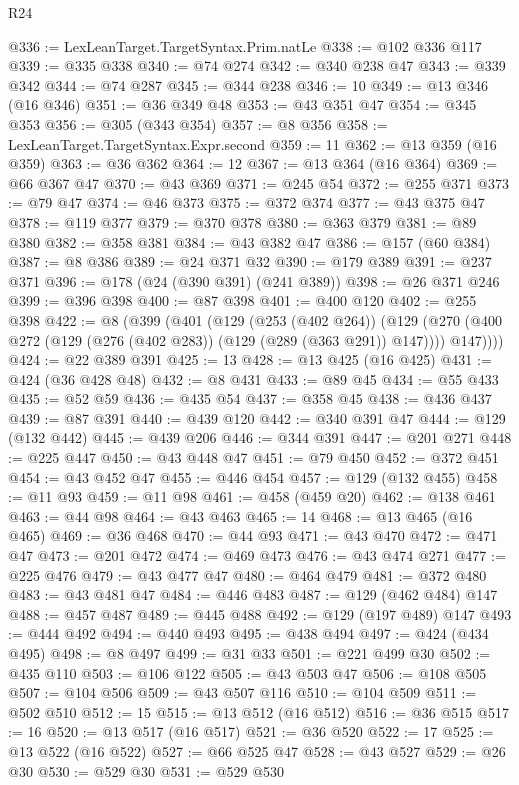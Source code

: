 \begin{lexlean}{R24}
\begin{coremodule}
{{{{{{{{{{{{{{{{{{{{{{{{{{{{{{{{{{{@336 := LexLeanTarget.TargetSyntax.Prim.natLe
@338 := @102 @336 @117
@339 := @335 @338
@340 := @74 @274
@342 := @340 @238 @47
@343 := @339 @342
@344 := @74 @287
@345 := @344 @238
@346 := 10
@349 := @13 @346 (@16 @346)
@351 := @36 @349 @48
@353 := @43 @351 @47
@354 := @345 @353
@356 := @305 (@343 @354)
@357 := @8 @356
@358 := LexLeanTarget.TargetSyntax.Expr.second
@359 := 11
@362 := @13 @359 (@16 @359)
@363 := @36 @362
@364 := 12
@367 := @13 @364 (@16 @364)
@369 := @66 @367 @47
@370 := @43 @369
@371 := @245 @54
@372 := @255 @371
@373 := @79 @47
@374 := @46 @373
@375 := @372 @374
@377 := @43 @375 @47
@378 := @119 @377
@379 := @370 @378
@380 := @363 @379
@381 := @89 @380
@382 := @358 @381
@384 := @43 @382 @47
@386 := @157 (@60 @384)
@387 := @8 @386
@389 := @24 @371 @32
@390 := @179 @389
@391 := @237 @371
@396 := @178 (@24 (@390 @391) (@241 @389))
@398 := @26 @371 @246
@399 := @396 @398
@400 := @87 @398
@401 := @400 @120
@402 := @255 @398
@422 := @8
    (@399
      (@401
        (@129
          (@253 (@402 @264))
          (@129 (@270 (@400 @272 (@129 (@276 (@402 @283)) (@129 (@289 (@363 @291)) @147)))) @147))))
@424 := @22 @389 @391
@425 := 13
@428 := @13 @425 (@16 @425)
@431 := @424 (@36 @428 @48)
@432 := @8 @431
@433 := @89 @45
@434 := @55 @433
@435 := @52 @59
@436 := @435 @54
@437 := @358 @45
@438 := @436 @437
@439 := @87 @391
@440 := @439 @120
@442 := @340 @391 @47
@444 := @129 (@132 @442)
@445 := @439 @206
@446 := @344 @391
@447 := @201 @271
@448 := @225 @447
@450 := @43 @448 @47
@451 := @79 @450
@452 := @372 @451
@454 := @43 @452 @47
@455 := @446 @454
@457 := @129 (@132 @455)
@458 := @11 @93
@459 := @11 @98
@461 := @458 (@459 @20)
@462 := @138 @461
@463 := @44 @98
@464 := @43 @463
@465 := 14
@468 := @13 @465 (@16 @465)
@469 := @36 @468
@470 := @44 @93
@471 := @43 @470
@472 := @471 @47
@473 := @201 @472
@474 := @469 @473
@476 := @43 @474 @271
@477 := @225 @476
@479 := @43 @477 @47
@480 := @464 @479
@481 := @372 @480
@483 := @43 @481 @47
@484 := @446 @483
@487 := @129 (@462 @484) @147
@488 := @457 @487
@489 := @445 @488
@492 := @129 (@197 @489) @147
@493 := @444 @492
@494 := @440 @493
@495 := @438 @494
@497 := @424 (@434 @495)
@498 := @8 @497
@499 := @31 @33
@501 := @221 @499 @30
@502 := @435 @110
@503 := @106 @122
@505 := @43 @503 @47
@506 := @108 @505
@507 := @104 @506
@509 := @43 @507 @116
@510 := @104 @509
@511 := @502 @510
@512 := 15
@515 := @13 @512 (@16 @512)
@516 := @36 @515
@517 := 16
@520 := @13 @517 (@16 @517)
@521 := @36 @520
@522 := 17
@525 := @13 @522 (@16 @522)
@527 := @66 @525 @47
@528 := @43 @527
@529 := @26 @30
@530 := @529 @30
@531 := @529 @530
}}}}}}}}}}}}}}}}}}}}}}}}}}}}}}}}}}}
\end{coremodule}
\end{lexlean}
